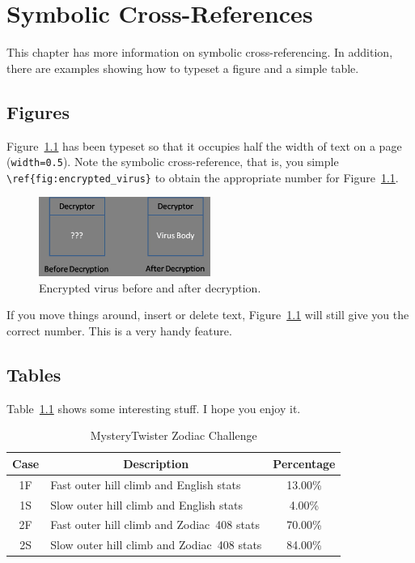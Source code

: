 \chapter{Symbolic Cross-References\label{chap:blah}}

This chapter has more information on symbolic cross-referencing.
In addition, there are examples showing how to typeset a figure
and a simple table.

\section{Figures}

Figure~\ref{fig:encrypted_virus} has been typeset so that it
occupies half the width of text on a page ({\tt width=0.5}). Note the 
symbolic cross-reference, that is, you simple \verb+\ref{fig:encrypted_virus}+
to obtain the appropriate number for Figure~\ref{fig:encrypted_virus}.

\begin{figure}[htb]
\centering
\includegraphics[width=0.5\textwidth]{images/encrypted_virus.jpg}
\caption{Encrypted virus before and after decryption.} 
\label{fig:encrypted_virus}
\end{figure}

If you move things around, insert or delete text, Figure~\ref{fig:encrypted_virus}
will still give you the correct number. This is a very handy feature.


\section{Tables}

Table~\ref{tab:19} 
shows some interesting stuff. I hope you enjoy it.

\begin{table}[htb]
\caption{MysteryTwister Zodiac Challenge\label{tab:19}}
\begin{center}
\begin{tabular}{c|lc}\hline\hline
Case & \multicolumn{1}{c}{Description} & Percentage\\ \hline
1F & Fast outer hill climb and English stats & 13.00\% \\
1S & Slow outer hill climb and English stats & \phantom{0}4.00\% \\
2F & Fast outer hill climb and Zodiac~408 stats & 70.00\% \\
2S & Slow outer hill climb and Zodiac~408 stats & 84.00\% \\ \hline\hline
\end{tabular}
\end{center}
\end{table}


